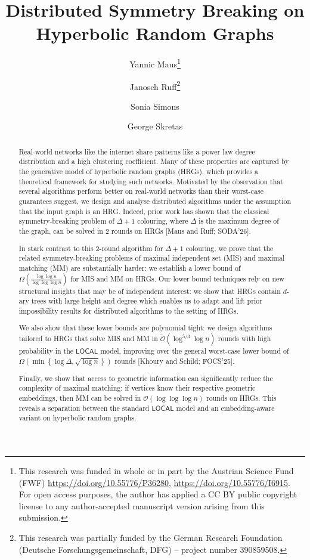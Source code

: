 \documentclass[letterpaper,11pt]{article}
\author[1]{Yannic Maus\thanks{This research was funded in whole or in part by the Austrian Science Fund (FWF) \url{https://doi.org/10.55776/P36280}, \url{https://doi.org/10.55776/I6915}. For open access purposes, the author has applied a CC BY public copyright license to any author-accepted manuscript version arising from this submission.}\authoremail{yannic.maus@tugraz.at}}
\author[2]{{Janosch Ruff\thanks{This research was partially funded by the German Research Foundation (Deutsche Forschungsgemeinschaft, DFG) – project number 390859508.}}\authoremail{Janosch.Ruff@hpi.de}}
\author[2]{{Sonia Simons}\authoremail{sonia.simons@student.hpi.uni-potsdam.de}}
\author[2]{{George Skretas}\authoremail{Georgios.Skretas@hpi.de}}
\affil[1]{TU Graz, Austria}
\affil[2]{Hasso Plattner Institute, University of Potsdam, Germany}
\title{Distributed Symmetry Breaking on Hyperbolic Random Graphs}
\date{}
\newcommand{\1}{\mathbb I}
\newcommand{\bigO}{\mathcal{O}}
\newcommand{\LOCAL}{\ensuremath{\mathsf{LOCAL}}\xspace}
\begin{document}
\allsectionsfont{\sffamily}
\maketitle
\thispagestyle{empty}


\begin{abstract}
Real-world networks like the internet share patterns like a power law degree distribution and a high clustering coefficient. Many of these properties are captured by the generative model of hyperbolic random graphs (HRGs), which provides a theoretical framework for studying such networks. Motivated by the observation that several algorithms perform better on real-world networks than their worst-case guarantees suggest, we design and analyse distributed algorithms under the assumption that the input graph is an HRG. 
Indeed, prior work has shown that the classical symmetry-breaking problem of $\Delta+1$ colouring, where $\Delta$ is the maximum degree of the graph, can be solved in 2 rounds on HRGs [Maus and Ruff; SODA'26]. 

In stark contrast to this 2-round algorithm for $\Delta+1$ colouring, we prove that the related symmetry-breaking problems of maximal independent set (MIS) and maximal matching (MM) are substantially harder: we establish a lower bound of $\Omega\left(\frac{\log\log n}{\log\log\log n}\right)$ for MIS and MM on HRGs. Our lower bound techniques rely on new structural insights that may be of independent interest: we show that HRGs contain $d$-ary trees with large height and degree which enables us to adapt and lift prior impossibility results for distributed algorithms to the setting of HRGs. 

We also show that these lower bounds are polynomial tight: we design algorithms tailored to HRGs that solve MIS and MM in $\tilde{\bigO}(\log^{5/3}\log n)$ rounds with high probability in the \LOCAL model, improving over the general worst-case lower bound of $\Omega\left(\min\left\{\log \Delta, \sqrt{\log n}\right\}\right)$ rounds [Khoury and Schild; FOCS'25].

Finally, we show that access to geometric information can significantly reduce the complexity of maximal matching: if vertices know their respective geometric embeddings, then MM can be solved in $\bigO(\log\log\log n)$ rounds on HRGs. This reveals a separation between the standard \LOCAL model and an embedding-aware variant on hyperbolic random graphs.
\end{abstract}

\clearpage
\thispagestyle{empty}
\tableofcontents
\end{document}
